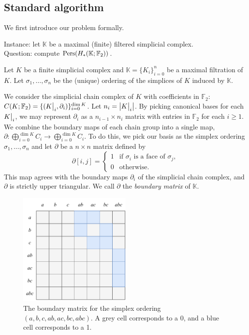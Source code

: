 \subsection{Standard algorithm}

We first introduce our problem formally.

\begin{problem}
  Instance: let $\mathbb K$ be a maximal (finite) filtered simplicial complex. \\
  Question: compute $\operatorname{Pers}(H_*(\mathbb K; \mathbb F_2))$.
\end{problem}

Let $K$ be a finite simplicial complex and $\mathbb K = \{K_i\}_{i=0}^n$ be a maximal filtration of $K$. Let $\sigma_1, \ldots, \sigma_n$ be the (unique) ordering of the simplices of $K$ induced by $\mathbb K$.

We consider the simplicial chain complex of $K$ with coefficients in $\mathbb F_2$: $C(K; \mathbb F_2) = \{(\restr Ki, \partial_i)\}_{i=0}^{\dim K}$. Let $n_i = \left\lvert \restr Ki \right\rvert$. By picking canonical bases for each $\restr Ki$, we may represent $\partial_i$ as a $n_{i-1} \times n_{i}$ matrix with entries in $\mathbb F_2$ for each $i \geq 1$. We combine the boundary maps of each chain group into a single map, $\partial: \bigoplus_{i=0}^{\dim K} C_i \to \bigoplus_{i=0}^{\dim K} C_i$. To do this, we pick our basis as the simplex ordering $\sigma_1, \ldots, \sigma_n$ and let $\partial$ be a $n \times n$ matrix defined by
\[
  \partial[i,j] = \begin{cases}
    1 & \text{if $\sigma_i$ is a face of $\sigma_j$}, \\
    0 & \text{otherwise}.
  \end{cases}
\]
This map agrees with the boundary maps $\partial_i$ of the simplicial chain complex, and $\partial$ is strictly upper triangular. We call $\partial$ the \emph{boundary matrix} of $\mathbb K$.

\begin{figure}
  \centering
  \includegraphics[width=0.5\textwidth]{content/4-comp-top/images/boundary-ex}
  \caption{The boundary matrix for the simplex ordering $(a, b, c, ab, ac, bc, abc)$. A grey cell corresponds to a 0, and a blue cell corresponds to a 1.}
  \label{fig:boundary-ex}
\end{figure}

